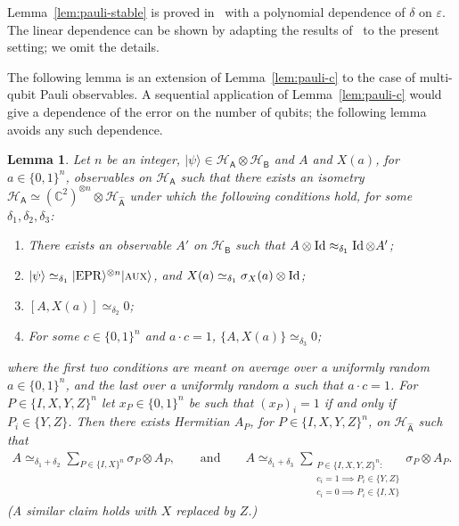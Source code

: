 \documentclass[11pt]{article}
\newtheorem{lemma}[theorem]{Lemma}
\theoremstyle{remark}
\theoremstyle{definition}
\newcommand{\ket}[1]{|#1\rangle}
\newcommand{\Id}{\ensuremath{\mathop{\rm Id}\nolimits}}
\newcommand{\reg}[1]{{\textsf{#1}}}
\newcommand{\C}{\ensuremath{\mathbb{C}}}
\newcommand{\mH}{\mathcal{H}}
\newcommand{\eps}{\varepsilon}
\newcommand{\EPR}{{\rm EPR}}
\newcommand{\aux}{\textsc {aux}}
\begin{document}
Lemma~\ref{lem:pauli-stable} is proved in~\cite{natarajan2016robust} with a polynomial dependence of $\delta$ on $\eps$. The linear dependence can be shown by adapting the results of~\cite{gowers2015inverse} to the present setting; we omit the details. 

The following lemma is an extension of Lemma~\ref{lem:pauli-c} to the case of multi-qubit Pauli observables. A sequential application of Lemma~\ref{lem:pauli-c} would give a dependence of the error on the number of qubits; the following lemma avoids any such dependence. 

\begin{lemma}\label{lem:pauli-c-n}
Let $n$ be an integer, $\ket{\psi} \in \mH_{\reg{A}} \otimes \mH_{\reg{B}}$ and $A$ and $X(a)$, for $a\in\{0,1\}^n$, observables on $\mH_{\reg{A}}$ such that there exists an isometry $\mH_{\reg{A}} \simeq (\C^2)^{\otimes n}\otimes \mH_{\hat{\reg{A}}}$ under which the following conditions hold, for some $\delta_1,\delta_2,\delta_3$:
\begin{enumerate}
\item[(i)] There exists an observable $A'$ on $\mH_\reg{B}$ such that $A\otimes \Id \approx_{\delta_1} \Id \otimes A'$;
\item[(ii)] $\ket{\psi} \simeq_{\delta_1} \ket{\EPR}^{\otimes n}\ket{\aux}$, and $X(a)\simeq_{\delta_1} \sigma_X(a) \otimes \Id$;
\item[(iii)] $[A,X(a)]\simeq_{\delta_2} 0$;
\item[(iv)] For some $c\in\{0,1\}^n$ and $a\cdot c=1$, $\{A,X(a)\} \simeq_{\delta_3} 0$;
\end{enumerate}
where the first two conditions are meant on average over a uniformly random $a\in\{0,1\}^n$, and the last over a uniformly random $a$ such that $a\cdot c =1$. For $P\in\{I,X,Y,Z\}^n$ let $x_P \in\{0,1\}^n$ be such that $(x_P)_i=1$ if and only if $P_i\in\{Y,Z\}$.
Then there exists Hermitian $A_P$, for $P\in\{I,X,Y,Z\}^n$, on $\mH_{\hat{\reg{A}}}$ such that 
\begin{align*}
A \simeq_{\delta_1+\delta_2} \sum_{P\in\{I,X\}^n} \sigma_P \otimes A_P,\qquad\text{and}\qquad A \simeq_{\delta_1+\delta_3} \sum_{\substack{P\in\{I,X,Y,Z\}^n:\\ c_i=1 \implies P_i \in \{Y,Z\}\\  c_i=0 \implies P_i \in \{I,X\}}} \sigma_P \otimes A_P.
\end{align*}
 (A similar claim holds with $X$ replaced by $Z$.)
\end{lemma}
\end{document}

